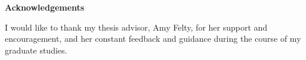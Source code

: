 
\begin{center}\textbf{Acknowledgements}\end{center}

I would like to thank my thesis advisor, Amy Felty, for her support and encouragement, and her constant feedback and guidance during the course of my graduate studies.


\cleardoublepage
